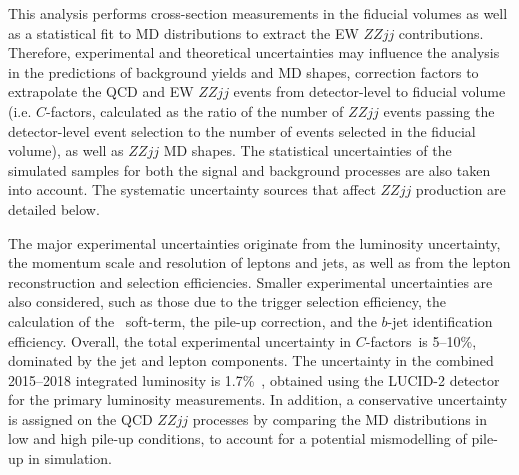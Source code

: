 This analysis performs cross-section measurements in the fiducial volumes as well as a statistical fit to MD distributions to extract the EW $ZZjj$ contributions. Therefore, experimental and theoretical uncertainties may influence the analysis in the predictions of background yields and MD shapes,
correction factors to extrapolate the QCD and EW $ZZjj$ events from detector-level to fiducial volume
(i.e. $C$-factors, calculated as the ratio of the number of $ZZjj$ events passing the detector-level event selection to the number of events selected in the fiducial volume), as well as $ZZjj$ MD shapes.
The statistical uncertainties of the simulated samples for both the signal and background processes are also taken into account.
The systematic uncertainty sources that affect $ZZjj$ production are detailed below.

The major experimental uncertainties originate from the luminosity uncertainty, the momentum scale and resolution of leptons and jets,
as well as from the lepton reconstruction and selection efficiencies.
Smaller experimental uncertainties are also considered, such as those due to the trigger selection efficiency, the calculation of the \met~soft-term, the pile-up correction, and the $b$-jet identification efficiency. Overall, the total experimental uncertainty in $C$-factors~is 5--10\%, dominated by the jet and lepton components. The uncertainty in the combined 2015--2018 integrated luminosity is 1.7\%~\cite{ATLAS-CONF-2019-021}, obtained using the LUCID-2 detector \cite{LUCID2} for the primary luminosity measurements.
In addition, a conservative uncertainty is assigned on the QCD $ZZjj$ processes by comparing the MD distributions in low and high pile-up conditions, to account for a potential mismodelling of pile-up in simulation.

